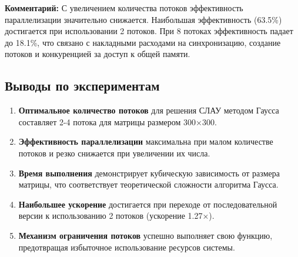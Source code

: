 \textbf{Комментарий:}
С увеличением количества потоков эффективность параллелизации значительно снижается. Наибольшая эффективность (63.5\%) достигается при использовании 2 потоков. При 8 потоках эффективность падает до 18.1\%, что связано с накладными расходами на синхронизацию, создание потоков и конкуренцией за доступ к общей памяти.

\subsection{Выводы по экспериментам}

\begin{enumerate}
\item \textbf{Оптимальное количество потоков} для решения СЛАУ методом Гаусса составляет 2-4 потока для матрицы размером 300×300.
\item \textbf{Эффективность параллелизации} максимальна при малом количестве потоков и резко снижается при увеличении их числа.
\item \textbf{Время выполнения} демонстрирует кубическую зависимость от размера матрицы, что соответствует теоретической сложности алгоритма Гаусса.
\item \textbf{Наибольшее ускорение} достигается при переходе от последовательной версии к использованию 2 потоков (ускорение 1.27×).
\item \textbf{Механизм ограничения потоков} успешно выполняет свою функцию, предотвращая избыточное использование ресурсов системы.
\end{enumerate}
